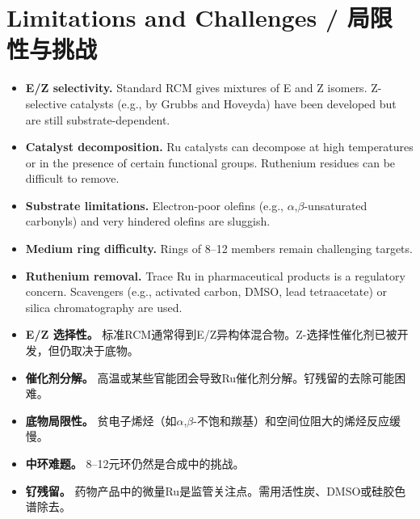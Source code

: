 \documentclass[11pt, a4paper]{article}
\begin{document}
\section{Limitations and Challenges / 局限性与挑战}

\begin{enbox}[English]
\begin{itemize}[nosep]
  \item \textbf{E/Z selectivity.}  Standard RCM gives mixtures of E and Z isomers.  Z-selective catalysts (e.g., by Grubbs and Hoveyda) have been developed but are still substrate-dependent.
  \item \textbf{Catalyst decomposition.}  Ru catalysts can decompose at high temperatures or in the presence of certain functional groups.  Ruthenium residues can be difficult to remove.
  \item \textbf{Substrate limitations.}  Electron-poor olefins (e.g., $\alpha$,$\beta$-unsaturated carbonyls) and very hindered olefins are sluggish.
  \item \textbf{Medium ring difficulty.}  Rings of 8--12 members remain challenging targets.
  \item \textbf{Ruthenium removal.}  Trace Ru in pharmaceutical products is a regulatory concern.  Scavengers (e.g., activated carbon, DMSO, lead tetraacetate) or silica chromatography are used.
\end{itemize}
\end{enbox}

\begin{cnbox}[中文]
\begin{itemize}[nosep]
  \item \textbf{E/Z 选择性。} 标准RCM通常得到E/Z异构体混合物。Z-选择性催化剂已被开发，但仍取决于底物。
  \item \textbf{催化剂分解。} 高温或某些官能团会导致Ru催化剂分解。钌残留的去除可能困难。
  \item \textbf{底物局限性。} 贫电子烯烃（如$\alpha$,$\beta$-不饱和羰基）和空间位阻大的烯烃反应缓慢。
  \item \textbf{中环难题。} 8--12元环仍然是合成中的挑战。
  \item \textbf{钌残留。} 药物产品中的微量Ru是监管关注点。需用活性炭、DMSO或硅胶色谱除去。
\end{itemize}
\end{cnbox}
\end{document}

